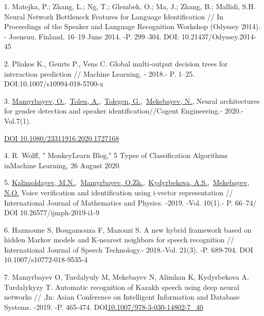 \begin{references}
1. Matejka, P.; Zhang, L.; Ng, T.; Glembek, O.; Ma, J.; Zhang, B.;
Mallidi, S.H. Neural Network Bottleneck Features for Language
Identification // In Proceedings of the Speaker and Language
Recognition Workshop (Odyssey 2014). - Joensuu, Finland, 16--19 June
2014. -P. 299--304. DOI: 10.21437/Odyssey.2014-45

2. Pliakos K., Geurts P., Vens C. Global multi-output decision trees for
interaction prediction // Machine Learning. - 2018.- P. 1--25.
DOI:10.1007/s10994-018-5700-x

3. \href{https://www.scopus.com/authid/detail.uri?authorId=55967630400}{Mamyrbayev,
O.},~\href{https://www.scopus.com/authid/detail.uri?authorId=57200275502}{Toleu,
A.},~\href{https://www.scopus.com/authid/detail.uri?authorId=57200276217}{Tolegen,
G.},~\href{https://www.scopus.com/authid/detail.uri?authorId=57202316868}{Mekebayev,
N.}, Neural architectures for gender detection and speaker
identification//Cogent Engineering.- 2020.-Vol.7(1).

\href{https://doi.org/10.1080/23311916.2020.1727168}{DOI
10.1080/23311916.2020.1727168}

4. R. Wolff, " MonkeyLearn Blog," 5 Types of Classification Algorithms
inMachine Learning, 26 August 2020.

5. \href{https://www.scopus.com/authid/detail.uri?authorId=56153126500}{Kalimoldayev,
M.N.},~\href{https://www.scopus.com/authid/detail.uri?authorId=55967630400}{Mamyrbayev,
O.Zh.},~\href{https://www.scopus.com/authid/detail.uri?authorId=57208346238}{Kydyrbekova,
A.S.},~\href{https://www.scopus.com/authid/detail.uri?authorId=57202316868}{Mekebayev,
N.O.} Voice verification and identification using i-vector
representation // International Journal of Mathematics and Physics.
-2019. -Vol. 10(1).- P. 66--74/ DOI 10.26577/ijmph-2019-i1-9

6. Hazmoune S, Bougamouza F, Mazouzi S. A new hybrid framework based on
hidden Markov models and K-nearest neighbors for speech recognition //
International Journal of Speech Technology.- 2018.-Vol. 21(3). -P.
689-704. DOI 10.1007/s10772-018-9535-4

7. Mamyrbayev O, Turdalyuly M, Mekebayev N, Alimhan K, Kydyrbekova A,
Turdalykyzy T. Automatic recognition of Kazakh speech using deep
neural networks // ,In: Asian Conference on Intelligent Information
and Database Systems. -2019. -P. 465-474.
DOI\href{http://dx.doi.org/10.1007/978-3-030-14802-7_40}{10.1007/978-3-030-14802-7\_40}


\end{references}
